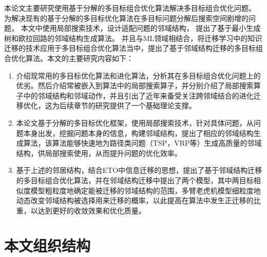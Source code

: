 本论文主要研究使用基于分解的多目标组合优化算法解决多目标组合优化问题。
为解决现有的基于分解的多目标优化算法在多目标问题分解后搜索空间剧增的问题，
本文中使用局部搜索技术，设计适配问题的邻域结构，
提出了基于最小生成树和欧拉回路的邻域结构生成算法。
并且与ML领域相结合，将迁移学习中的知识迁移的技术应用于多目标组合优化算法当中，提出了基于邻域结构迁移的多目标组合优化算法。本文的主要研究内容如下：
\begin{enumerate}
    \item 介绍现常用的多目标优化算法和进化算法，分析其在多目标组合优化问题上的优劣。然后介绍常被嵌入到算法中的局部搜索算子，并分别介绍了局部搜索算子中的邻域结构和邻域动作，并且引出了近年来备受关注跨领域结合的进化迁移优化，这为后续章节的研究提供了一个基础理论支撑。
    \item 本论文基于分解的多目标优化框架，使用局部搜索技术，针对具体问题，从问题本身出发，挖掘问题本身的信息，构建邻域结构，提出了相应的邻域结构生成算法，该算法能够快速地为路径类问题（TSP，VRP等）生成高质量的邻域结构，供局部搜索使用，从而提升问题的优化效率。
    \item 基于上述的邻居结构，结合ETO中信息迁移的思想，提出了基于邻域结构迁移的多目标组合优化算法，并在邻域结构迁移中提出了两个模型，其中两目标相似度模型粗粒度地确定能被迁移的邻域结构的范围，多臂老虎机模型细粒度地动态改变邻域结构被选择用来迁移的概率，以此提高在算法中发生正迁移的比重，以达到更好的收敛效果和优化质量。
\end{enumerate}

\section{本文组织结构}

